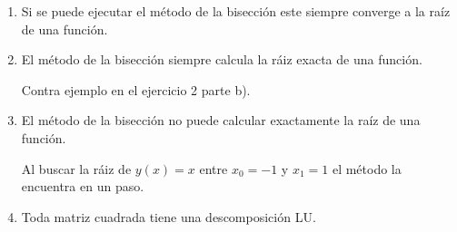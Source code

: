\documentclass[11pt]{article}
\begin{document}
\begin{enumerate}
\begin{enumerate}
\item
    \begin{minipage}{0.4\textwidth}
	Si se puede ejecutar el m\'etodo de la bisecci\'on este siempre converge a la ra\'iz de una funci\'on.
	\end{minipage} 
    \begin{minipage}{0.4\textwidth}
    \end{minipage} 
%
\item
    \begin{minipage}{0.4\textwidth}
	El m\'etodo de la bisecci\'on siempre calcula la r\'aiz exacta de una funci\'on.
	\end{minipage} 
    \begin{minipage}{0.4\textwidth}
    Contra ejemplo en el ejercicio 2 parte b).

	\end{minipage} 
%    
    \item
    \begin{minipage}{0.4\textwidth}
	El m\'etodo de la bisecci\'on no puede calcular exactamente la ra\'iz de una funci\'on.
	\end{minipage} 
    \begin{minipage}{0.4\textwidth}
    Al buscar la r\'aiz de $y(x)=x$ entre $x_0=-1$ y $x_1=1$ el m\'etodo la encuentra en un paso.
    
    \end{minipage}
%
\item
    \begin{minipage}{0.4\textwidth}
	Toda matriz cuadrada tiene una descomposici\'on LU.
	\end{minipage} 
    \begin{minipage}{0.4\textwidth}
    \end{minipage}
\end{enumerate}


\end{enumerate}
\end{document}

